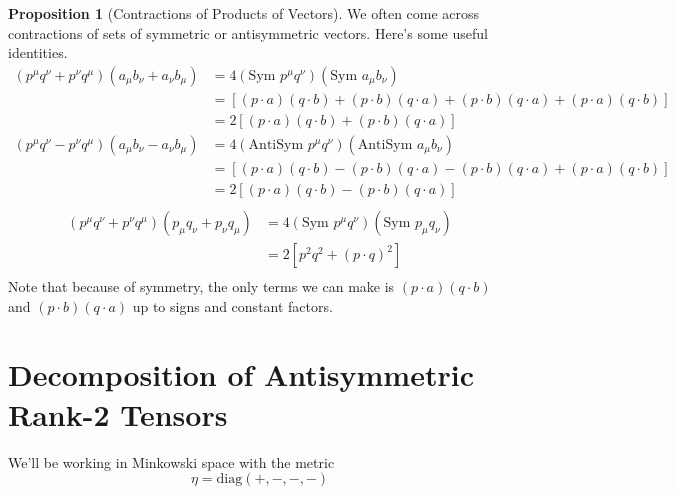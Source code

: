 \documentclass[12pt]{article}
\theoremstyle{definition}
\newtheorem{prop}{Proposition}[section]
\newcommand{\sym}{\text{Sym }}
\newcommand{\antisym}{\text{AntiSym }}
\begin{document}
\begin{prop}[Contractions of Products of Vectors]
    We often come across contractions of sets of symmetric or antisymmetric vectors. Here's some useful
    identities.
    \begin{equation*}
    \begin{split}
        (p^\mu q^\nu + p^\nu q^\mu) (a_\mu b_\nu + a_\nu b_\mu) 
            &= 4 (\sym p^\mu q^\nu) (\sym a_\mu b_\nu) \\
            &= \left[ (p \cdot a) (q \cdot b) + (p \cdot b) (q \cdot a) + (p \cdot b) (q \cdot a) + (p \cdot a) (q \cdot b) \right]\\
            &= 2 \left[ (p \cdot a)(q \cdot b) + (p \cdot b)(q \cdot a) \right] 
    \end{split}
    \end{equation*}
    \begin{equation*}
    \begin{split}
        \left( p^\mu q^\nu - p^\nu q^\mu \right) \left( a_\mu b_\nu - a_\nu b_\mu \right)
            &= 4 (\antisym p^\mu q^\nu) (\antisym a_\mu b_\nu) \\
            &= \left[ (p \cdot a)(q \cdot b) - (p \cdot b)(q \cdot a) - (p \cdot b)(q \cdot a) + (p \cdot a)(q \cdot b) \right] \\
            &= 2 \left[ (p \cdot a)(q \cdot b) - (p \cdot b)(q \cdot a) \right] \\
    \end{split}
    \end{equation*}
    \begin{equation*}
    \begin{split}
        (p^\mu q^\nu + p^\nu q^\mu) (p_\mu q_\nu + p_\nu q_\mu)
            &= 4 (\sym p^\mu q^\nu) (\sym p_\mu q_\nu) \\
            &= 2 \left[ p^2 q^2 + (p \cdot q)^2 \right] \\
    \end{split}
    \end{equation*}
    Note that because of symmetry, the only terms we can make is $(p \cdot a)(q \cdot b)$ and $(p \cdot b)(q \cdot a)$
    up to signs and constant factors.
\end{prop}

\section{Decomposition of Antisymmetric Rank-2 Tensors}
We'll be working in Minkowski space with the metric
\begin{equation*}
    \eta = \text{diag}(+,-,-,-)
\end{equation*}
\end{document}
